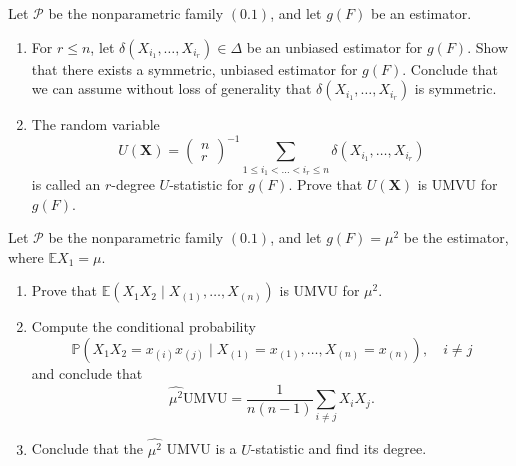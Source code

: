 \begin{ex}
    Let \(\mathcal{P}\) be the nonparametric family \((0.1)\), and let \(g(F)\) be an estimator. 
    \begin{enumerate}
        \item For \(r \leq n\), let \(\delta\left(X_{i_{1}}, \ldots, X_{i_{r}}\right) \in \Delta\) be an unbiased estimator for \(g(F)\). Show that there exists a symmetric, unbiased estimator for \(g(F)\). Conclude that we can assume without loss of generality that \(\delta\left(X_{i_{1}}, \ldots, X_{i_{r}}\right)\) is symmetric. 
        \item The random variable
        \[
        U(\mathbf{X})=\left(\begin{array}{l}
        n \\
        r
        \end{array}\right)^{-1} \sum_{1 \leq i_{1}<\ldots<i_{r} \leq n} \delta\left(X_{i_{1}}, \ldots, X_{i_{r}}\right)
        \]
        is called an \(r\)-degree \(U\)-statistic for \(g(F)\). Prove that \(U(\mathbf{X})\) is UMVU for \(g(F)\). 
    \end{enumerate}
\end{ex}


\begin{ex}
    Let \(\mathcal{P}\) be the nonparametric family \((0.1)\), and let \(g(F)=\mu^{2}\) be the estimator, where \(\mathbb{E} X_{1}=\mu\). 
    \begin{enumerate}
        \item Prove that \(\mathbb{E}\left(X_{1} X_{2} \mid X_{(1)}, \ldots, X_{(n)}\right)\) is UMVU for \(\mu^{2}\). 
        \item Compute the conditional probability
        \[
        \mathbb{P}\left(X_{1} X_{2}=x_{(i)} x_{(j)} \mid X_{(1)}=x_{(1)}, \ldots, X_{(n)}=x_{(n)}\right), \quad i \neq j
        \]
        and conclude that
        \[
        \widehat{\mu^{2}} \mathrm{UMVU}=\frac{1}{n(n-1)} \sum_{i \neq j} X_{i} X_{j}. 
        \]
        \item Conclude that the \(\widehat{\mu^{2}}\) UMVU is a \(U\)-statistic and find its degree. 
    \end{enumerate}
\end{ex}

